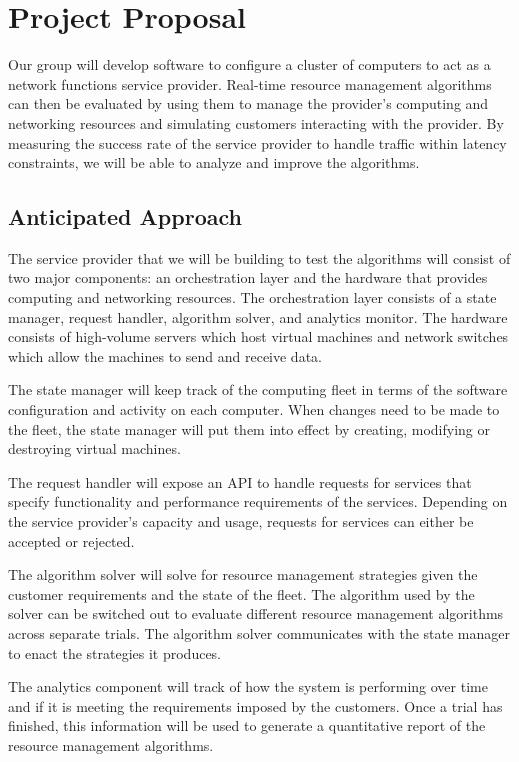 \documentclass{sig-alternate}
\begin{document}
\section{Project Proposal}
\label{sec:project_proposal}
Our group will develop software to configure a cluster of computers to act as a network functions service provider. Real-time resource management algorithms can then be evaluated by using them to manage the provider's computing and networking resources and simulating customers interacting with the provider. By measuring the success rate of the service provider to handle traffic within latency constraints, we will be able to analyze and improve the algorithms.

\subsection{Anticipated Approach}
\label{subsec:approach}

The service provider that we will be building to test the algorithms will consist of two major components: an orchestration layer and the hardware that provides computing and networking resources. The orchestration layer consists of a state manager, request handler, algorithm solver, and analytics monitor. The hardware consists of high-volume servers which host virtual machines and network switches which allow the machines to send and receive data.

The state manager will keep track of the computing fleet in terms of the software configuration and activity on each computer. When changes need to be made to the fleet, the state manager will put them into effect by creating, modifying or destroying virtual machines.

The request handler will expose an API to handle requests for services that specify functionality and performance requirements of the services. Depending on the service provider's capacity and usage, requests for services can either be accepted or rejected.

The algorithm solver will solve for resource management strategies given the customer requirements and the state of the fleet. The algorithm used by the solver can be switched out to evaluate different resource management algorithms across separate trials. The algorithm solver communicates with the state manager to enact the strategies it produces.

The analytics component will track of how the system is performing over time and if it is meeting the requirements imposed by the customers. Once a trial has finished, this information will be used to generate a quantitative report of the resource management algorithms.
\end{document}
